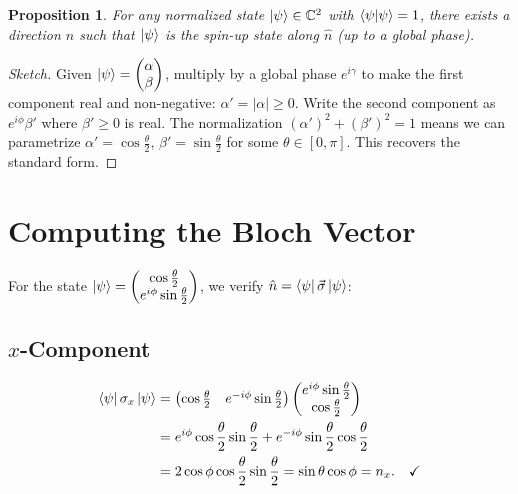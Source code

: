 \documentclass[11pt,a4paper]{article}
\theoremstyle{definition}
\theoremstyle{plain}
\newtheorem{proposition}{Proposition}[section]
\theoremstyle{remark}
\begin{document}
\begin{proposition}
    For any normalized state $\ket{\psi} \in \mathbb{C}^2$ with $\braket{\psi}{\psi} = 1$, there exists a direction $\hat{n}$ such that $\ket{\psi}$ is the spin-up state along $\hat{n}$ (up to a global phase).
\end{proposition}

\begin{proof}[Sketch]
    Given $\ket{\psi} = \begin{pmatrix}\alpha\\\beta\end{pmatrix}$, multiply by a global phase $e^{i\gamma}$ to make the first component real and non-negative: $\alpha' = |\alpha| \geq 0$. Write the second component as $e^{i\phi}\beta'$ where $\beta' \geq 0$ is real. The normalization $(\alpha')^2 + (\beta')^2 = 1$ means we can parametrize $\alpha' = \cos\frac{\theta}{2}$, $\beta' = \sin\frac{\theta}{2}$ for some $\theta \in [0, \pi]$. This recovers the standard form.
\end{proof}

\section{Computing the Bloch Vector}

For the state $\ket{\psi} = \begin{pmatrix}\cos\frac{\theta}{2} \\ e^{i\phi}\sin\frac{\theta}{2}\end{pmatrix}$, we verify $\hat{n} = \bra{\psi}\vec{\sigma}\ket{\psi}$:

\subsection{$x$-Component}

\begin{align}
    \bra{\psi}\sigma_x\ket{\psi} &= \begin{pmatrix}\cos\frac{\theta}{2} & e^{-i\phi}\sin\frac{\theta}{2}\end{pmatrix}\begin{pmatrix}e^{i\phi}\sin\frac{\theta}{2}\\\cos\frac{\theta}{2}\end{pmatrix} \\
    &= e^{i\phi}\cos\frac{\theta}{2}\sin\frac{\theta}{2} + e^{-i\phi}\sin\frac{\theta}{2}\cos\frac{\theta}{2} \\
    &= 2\cos\phi\cos\frac{\theta}{2}\sin\frac{\theta}{2} = \sin\theta\cos\phi = n_x. \quad\checkmark
\end{align}
\end{document}
